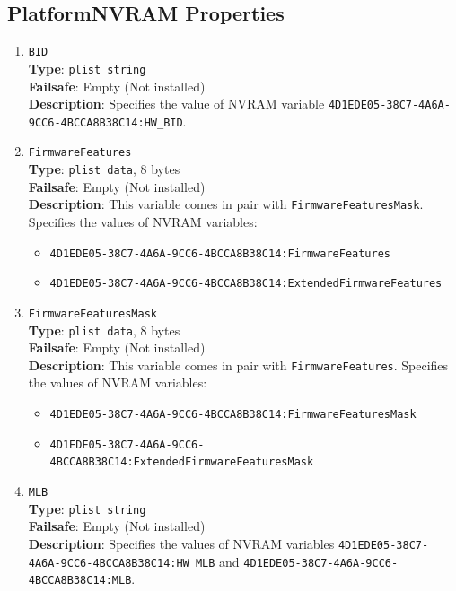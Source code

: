 \documentclass[]{article}
\makeatletter
\providecommand{\tightlist}{%
  \setlength{\itemsep}{0pt}\setlength{\parskip}{0pt}}
\renewcommand{\label}[1]{%
\zref@wrapper@immediate{\oldlabel{#1}}}  %
\makeatother
\begin{document}
\subsection{PlatformNVRAM Properties}\label{platforminfonvram}

\begin{enumerate}

\item
  \texttt{BID}\\
  \textbf{Type}: \texttt{plist\ string}\\
  \textbf{Failsafe}: Empty (Not installed)\\
  \textbf{Description}: Specifies the value of NVRAM variable
  \texttt{4D1EDE05-38C7-4A6A-9CC6-4BCCA8B38C14:HW\_BID}.

\item
  \texttt{FirmwareFeatures}\\
  \textbf{Type}: \texttt{plist\ data}, 8 bytes\\
  \textbf{Failsafe}: Empty (Not installed)\\
  \textbf{Description}: This variable comes in pair with \texttt{FirmwareFeaturesMask}.
  Specifies the values of NVRAM variables:
  \begin{itemize}
  \tightlist
  \item \texttt{4D1EDE05-38C7-4A6A-9CC6-4BCCA8B38C14:FirmwareFeatures}
  \item \texttt{4D1EDE05-38C7-4A6A-9CC6-4BCCA8B38C14:ExtendedFirmwareFeatures}
  \end{itemize}

\item
  \texttt{FirmwareFeaturesMask}\\
  \textbf{Type}: \texttt{plist\ data}, 8 bytes\\
  \textbf{Failsafe}: Empty (Not installed)\\
  \textbf{Description}: This variable comes in pair with \texttt{FirmwareFeatures}.
  Specifies the values of NVRAM variables:
  \begin{itemize}
  \tightlist
  \item \texttt{4D1EDE05-38C7-4A6A-9CC6-4BCCA8B38C14:FirmwareFeaturesMask}
  \item \texttt{4D1EDE05-38C7-4A6A-9CC6-4BCCA8B38C14:ExtendedFirmwareFeaturesMask}
  \end{itemize}

\item
  \texttt{MLB}\\
  \textbf{Type}: \texttt{plist\ string}\\
  \textbf{Failsafe}: Empty (Not installed)\\
  \textbf{Description}: Specifies the values of NVRAM variables
  \texttt{4D1EDE05-38C7-4A6A-9CC6-4BCCA8B38C14:HW\_MLB} and
  \texttt{4D1EDE05-38C7-4A6A-9CC6-4BCCA8B38C14:MLB}.


\end{enumerate}
\end{document}
